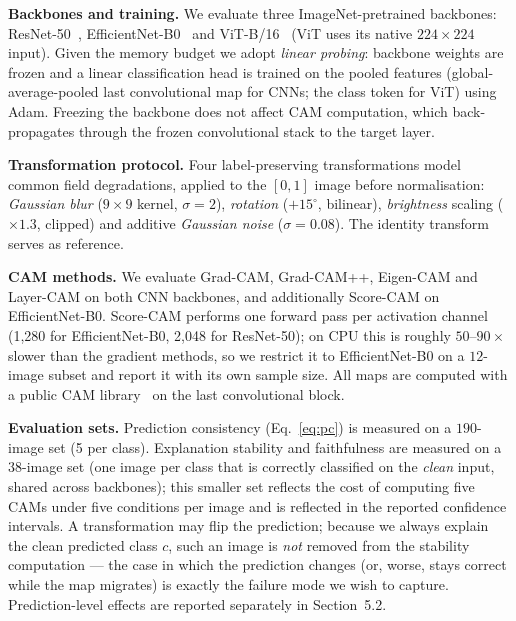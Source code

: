 \documentclass[runningheads]{llncs}
\begin{document}
\smallskip
\noindent\textbf{Backbones and training.} We evaluate three ImageNet-pretrained
backbones: ResNet-50~\cite{he2016resnet}, EfficientNet-B0~\cite{tan2019efficientnet}
and ViT-B/16~\cite{dosovitskiy2021vit} (ViT uses its native $224\times224$
input). Given the memory budget we adopt \emph{linear probing}: backbone weights
are frozen and a linear classification head is trained on the pooled features
(global-average-pooled last convolutional map for CNNs; the class token for ViT)
using Adam. Freezing the backbone does not affect CAM computation, which
back-propagates through the frozen convolutional stack to the target layer.

\smallskip
\noindent\textbf{Transformation protocol.} Four label-preserving transformations
model common field degradations, applied to the $[0,1]$ image before
normalisation: \emph{Gaussian blur} ($9\times9$ kernel, $\sigma=2$),
\emph{rotation} ($+15^{\circ}$, bilinear), \emph{brightness} scaling
($\times1.3$, clipped) and additive \emph{Gaussian noise} ($\sigma=0.08$). The
identity transform serves as reference.

\smallskip
\noindent\textbf{CAM methods.} We evaluate Grad-CAM, Grad-CAM++, Eigen-CAM and
Layer-CAM on both CNN backbones, and additionally Score-CAM on EfficientNet-B0.
Score-CAM performs one forward pass per activation channel (1{,}280 for
EfficientNet-B0, 2{,}048 for ResNet-50); on CPU this is roughly $50$--$90\times$
slower than the gradient methods, so we restrict it to EfficientNet-B0 on a
$12$-image subset and report it with its own sample size. All maps are computed
with a public CAM library~\cite{gildenblat2021pytorchcam} on the last
convolutional block.

\smallskip
\noindent\textbf{Evaluation sets.} Prediction consistency (Eq.~\ref{eq:pc}) is
measured on a $190$-image set (5 per class). Explanation stability and
faithfulness are measured on a $38$-image set (one image per class that is
correctly classified on the \emph{clean} input, shared across backbones); this
smaller set reflects the cost of computing five CAMs under five conditions per
image and is reflected in the reported confidence intervals. A transformation may
flip the prediction; because we always explain the clean predicted class $c$, such
an image is \emph{not} removed from the stability computation --- the case in which
the prediction changes (or, worse, stays correct while the map migrates) is exactly
the failure mode we wish to capture. Prediction-level effects are reported
separately in Section~5.2.
\end{document}
